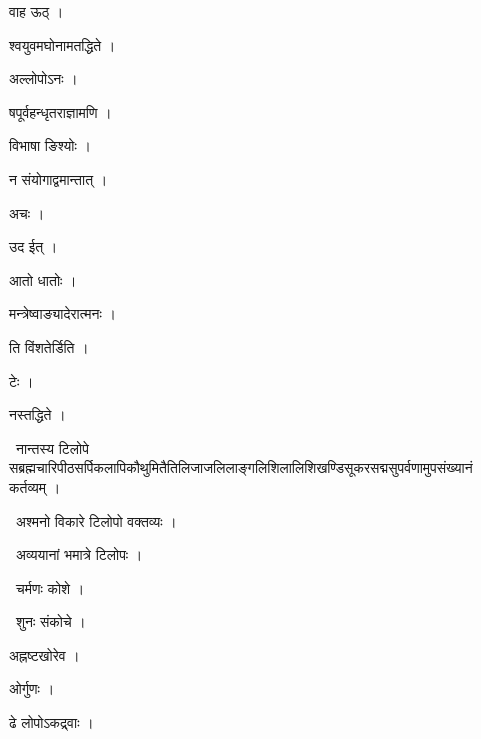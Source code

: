 \documentclass[10pt, openany, oneside]{book}
\begin{document}
\noindent वाह ऊठ् ।

\noindent श्वयुवमघोनामतद्धिते ।

\noindent अल्लोपोऽनः ।

\noindent षपूर्वहन्धृतराज्ञामणि ।

\noindent विभाषा ङिश्योः ।

\noindent न संयोगाद्वमान्तात् ।

\noindent अचः ।

\noindent उद ईत् ।

\noindent आतो धातोः ।

\noindent मन्त्रेष्वाङ्यादेरात्मनः ।

\noindent ति विंशतेर्डिति ।

\noindent टेः ।

\noindent नस्तद्धिते ।

\par\noindent\hspace{1.5em}{\vps वा॰}~{\qt नान्तस्य टिलोपे सब्रह्मचारिपीठसर्पिकलापिकौथुमितैतिलिजाजलिलाङ्गलिशिलालिशिखण्डिसूकरसद्मसुपर्वणामुपसंख्यानं कर्तव्यम् ।}

\par\noindent\hspace{1.5em}{\vps वा॰}~{\qt अश्मनो विकारे टिलोपो वक्तव्यः ।}

\par\noindent\hspace{1.5em}{\vps वा॰}~{\qt अव्ययानां भमात्रे टिलोपः ।}

\par\noindent\hspace{1.5em}{\vps वा॰}~{\qt चर्मणः कोशे ।}

\par\noindent\hspace{1.5em}{\vps वा॰}~{\qt शुनः संकोचे ।}

\noindent अह्नष्टखोरेव ।

\noindent ओर्गुणः ।

\noindent ढे लोपोऽकद्र्वाः ।
\end{document}

